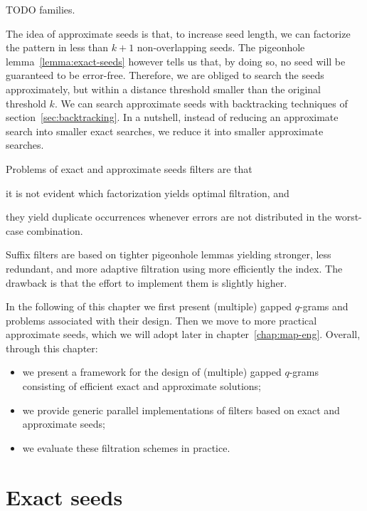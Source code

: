 TODO families.

The idea of approximate seeds is that, to increase seed length, we can factorize the pattern in less than $k+1$ non-overlapping seeds.
The pigeonhole lemma~\ref{lemma:exact-seeds} however tells us that, by doing so, no seed will be guaranteed to be error-free.
Therefore, we are obliged to search the seeds approximately, but within a distance threshold smaller than the original threshold $k$.
We can search approximate seeds with backtracking techniques of section~\ref{sec:backtracking}.
In a nutshell, instead of reducing an approximate search into smaller exact searches, we reduce it into smaller approximate searches.

Problems of exact and approximate seeds filters are that
\begin{inparaenum}[(i)]
\item it is not evident which factorization yields optimal filtration, and
\item they yield duplicate occurrences whenever errors are not distributed in the worst-case combination.
\end{inparaenum}
Suffix filters are based on tighter pigeonhole lemmas yielding stronger, less redundant, and more adaptive filtration using more efficiently the index.
The drawback is that the effort to implement them is slightly higher.

In the following of this chapter we first present (multiple) gapped $q$-grams and problems associated with their design.
Then we move to more practical approximate seeds, which we will adopt later in chapter~\ref{chap:map-eng}.
Overall, through this chapter:
\begin{itemize}
\item we present a framework for the design of (multiple) gapped $q$-grams consisting of efficient exact and approximate solutions;
\item we provide generic parallel implementations of filters based on exact and approximate seeds;
\item we evaluate these filtration schemes in practice.
\end{itemize}

\section{Exact seeds}

